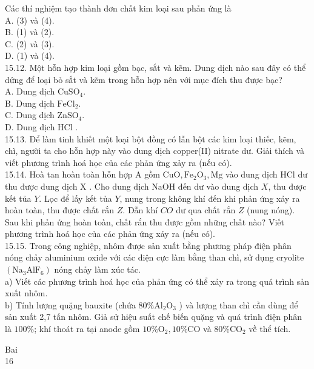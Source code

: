 \documentclass[10pt]{article}
\begin{document}
Các thí nghiệm tạo thành đơn chất kim loại sau phản ứng là\\
A. (3) và (4).\\
B. (1) và (2).\\
C. (2) và (3).\\
D. (1) và (4).\\
15.12. Một hỗn hợp kim loại gồm bạc, sắt và kẽm. Dung dịch nào sau đây có thể dửng để loại bỏ sắt và kẽm trong hỗn hợp nên với mục đích thu được bạc?\\
A. Dung dịch $\mathrm{CuSO}_{4}$.\\
B. Dung dịch $\mathrm{FeCl}_{2}$.\\
C. Dung dịch $\mathrm{ZnSO}_{4}$.\\
D. Dung dịch HCl .\\
15.13. Để làm tinh khiết một loại bột đồng có lẫn bột các kim loại thiếc, kẽm, chì, người ta cho hỗn hợp này vào dung dịch copper(II) nitrate dư. Giải thích và viết phương trình hoá học của các phản ứng xảy ra (nếu có).\\
15.14. Hoà tan hoàn toàn hỗn hợp A gồm $\mathrm{CuO}, \mathrm{Fe}_{2} \mathrm{O}_{3}, \mathrm{Mg}$ vào dung dịch HCl dư thu được dung dịch X . Cho dung dịch NaOH đến dư vào dung dịch $X$, thu được kết tủa $Y$. Lọc để lấy kết tủa $Y$, nung trong không khí đến khi phản ứng xảy ra hoàn toàn, thu được chất rắn $Z$. Dẫn khí $C O$ dư qua chất rắn $Z$ (nung nóng). Sau khi phản ứng hoàn toàn, chất rắn thu được gồm những chất nào? Viết phương trình hoá học của các phản ứng xảy ra (nếu có).\\
15.15. Trong công nghiệp, nhôm được sản xuất bằng phương pháp điện phân nóng chảy aluminium oxide với các điện cực làm bằng than chì, sử dụng cryolite $\left(\mathrm{Na}_{3} \mathrm{AlF}_{6}\right)$ nóng chảy làm xúc tác.\\
a) Viết các phương trình hoá học của phản ứng có thể xảy ra trong quá trình sản xuất nhôm.\\
b) Tính lượng quặng bauxite (chứa $80 \% \mathrm{Al}_{2} \mathrm{O}_{3}$ ) và lượng than chì cần dùng để sản xuất 2,7 tấn nhôm. Giả sử hiệu suất chế biến quặng và quá trình điện phân là $100 \%$; khí thoát ra tại anode gồm $10 \% \mathrm{O}_{2}, 10 \% \mathrm{CO}$ và $80 \% \mathrm{CO}_{2}$ về thể tích.

Bai\\
16
\end{document}
